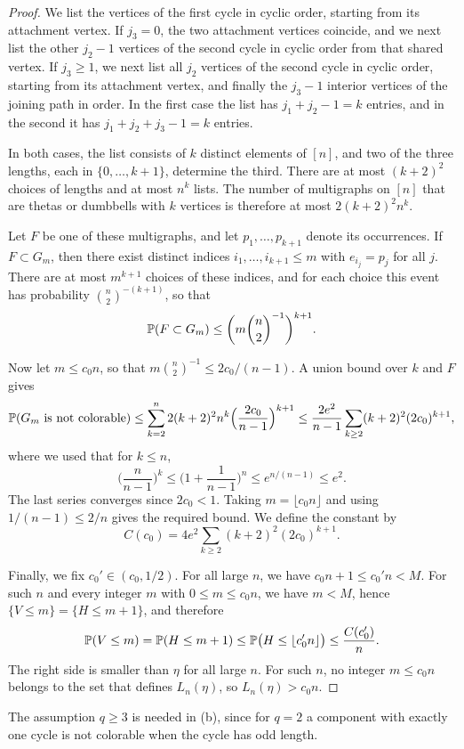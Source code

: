 \begin{proof}
We list the vertices of the first cycle in cyclic order, starting from its attachment vertex. If $j_3 = 0$, the two attachment vertices coincide, and we next list the other $j_2 - 1$ vertices of the second cycle in cyclic order from that shared vertex. If $j_3 \ge 1$, we next list all $j_2$ vertices of the second cycle in cyclic order, starting from its attachment vertex, and finally the $j_3 - 1$ interior vertices of the joining path in order. In the first case the list has $j_1 + j_2 - 1 = k$ entries, and in the second it has $j_1 + j_2 + j_3 - 1 = k$ entries.

In both cases, the list consists of $k$ distinct elements of $[n]$, and two of the three lengths, each in $\{0, \dots, k + 1\}$, determine the third. There are at most $(k + 2)^2$ choices of lengths and at most $n^k$ lists. The number of multigraphs on $[n]$ that are thetas or dumbbells with $k$ vertices is therefore at most $2 (k + 2)^2 n^k$.

Let $F$ be one of these multigraphs, and let $p_1, \dots, p_{k + 1}$ denote its occurrences. If $F \subset G_m$, then there exist distinct indices $i_1, \dots, i_{k + 1} \le m$ with $e_{i_j} = p_j$ for all $j$. There are at most $m^{k + 1}$ choices of these indices, and for each choice this event has probability $\binom{n}{2}^{-(k + 1)}$, so that
\[
\mathbb P(F \subset G_m) \le \bigg(m \binom{n}{2}^{-1}\bigg)^{k + 1}.
\]

Now let $m \le c_0 n$, so that $m \binom{n}{2}^{-1} \le 2 c_0/(n - 1)$. A union bound over $k$ and $F$ gives
\[
\mathbb P(G_m \text{ is not colorable}) \le \sum_{k = 2}^n 2 (k + 2)^2 n^k \Big(\frac{2 c_0}{n - 1}\Big)^{k + 1} \le \frac{2 e^2}{n - 1} \sum_{k \ge 2} (k + 2)^2 (2 c_0)^{k + 1},
\]
where we used that for $k \le n$,
\[
\Big(\frac{n}{n - 1}\Big)^k \le \Big(1 + \frac{1}{n - 1}\Big)^n \le e^{n/(n - 1)} \le e^2.
\]
The last series converges since $2 c_0 < 1$. Taking $m = \lfloor c_0n\rfloor$ and using $1/(n - 1) \le 2/n$ gives the required bound. We define the constant by
\[
C(c_0) = 4 e^2 \sum_{k \ge 2} (k + 2)^2 (2 c_0)^{k + 1}.
\]

Finally, we fix $c_0' \in (c_0, 1/2)$. For all large $n$, we have $c_0 n + 1 \le c_0' n < M$. For such $n$ and every integer $m$ with $0 \le m \le c_0 n$, we have $m < M$, hence $\{V \le m\} = \{H \le m + 1\}$, and therefore
\[
\mathbb P(V \le m) = \mathbb P(H \le m + 1) \le \mathbb P\big(H \le \lfloor c_0' n \rfloor\big) \le \frac{C(c_0')}{n}.
\]
The right side is smaller than $\eta$ for all large $n$. For such $n$, no integer $m \le c_0 n$ belongs to the set that defines $L_n(\eta)$, so $L_n(\eta) > c_0 n$.
\end{proof}

The assumption $q \ge 3$ is needed in (b), since for $q = 2$ a component with exactly one cycle is not colorable when the cycle has odd length.
